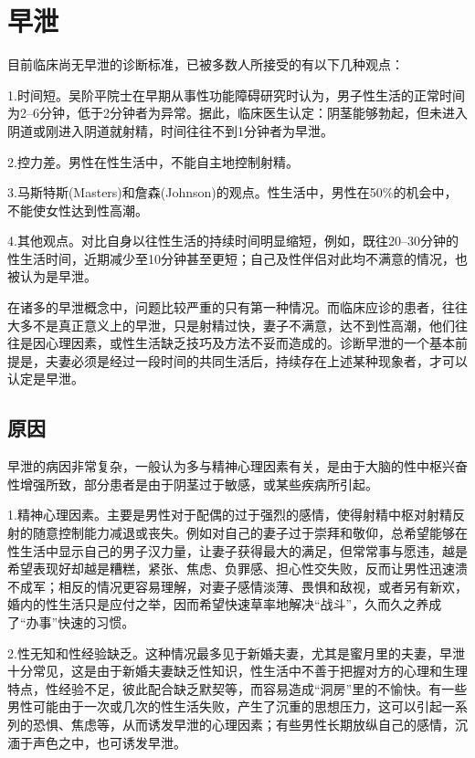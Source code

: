 \documentclass[12pt,UTF8]{ctexbook}
\begin{document}
\chapter{早泄}

目前临床尚无早泄的诊断标准，已被多数人所接受的有以下几种观点：

1.时间短。吴阶平院士在早期从事性功能障碍研究时认为，男子性生活的正常时间为2--6分钟，低于2分钟者为异常。据此，临床医生认定：阴茎能够勃起，但未进入阴道或刚进入阴道就射精，时间往往不到1分钟者为早泄。

2.控力差。男性在性生活中，不能自主地控制射精。

3.马斯特斯(Masters)和詹森(Johnson)的观点。性生活中，男性在50\%的机会中，不能使女性达到性高潮。

4.其他观点。对比自身以往性生活的持续时间明显缩短，例如，既往20--30分钟的性生活时间，近期减少至10分钟甚至更短；自己及性伴侣对此均不满意的情况，也被认为是早泄。

在诸多的早泄概念中，问题比较严重的只有第一种情况。而临床应诊的患者，往往大多不是真正意义上的早泄，只是射精过快，妻子不满意，达不到性高潮，他们往往是因心理因素，或性生活缺乏技巧及方法不妥而造成的。诊断早泄的一个基本前提是，夫妻必须是经过一段时间的共同生活后，持续存在上述某种现象者，才可以认定是早泄。

\section{原因}

早泄的病因非常复杂，一般认为多与精神心理因素有关，是由于大脑的性中枢兴奋性增强所致，部分患者是由于阴茎过于敏感，或某些疾病所引起。

1.精神心理因素。主要是男性对于配偶的过于强烈的感情，使得射精中枢对射精反射的随意控制能力减退或丧失。例如对自己的妻子过于崇拜和敬仰，总希望能够在性生活中显示自己的男子汉力量，让妻子获得最大的满足，但常常事与愿违，越是希望表现好却越是糟糕，紧张、焦虑、负罪感、担心性交失败，反而让男性迅速溃不成军；相反的情况更容易理解，对妻子感情淡薄、畏惧和敌视，或者另有新欢，婚内的性生活只是应付之举，因而希望快速草率地解决“战斗”，久而久之养成了“办事”快速的习惯。

2.性无知和性经验缺乏。这种情况最多见于新婚夫妻，尤其是蜜月里的夫妻，早泄十分常见，这是由于新婚夫妻缺乏性知识，性生活中不善于把握对方的心理和生理特点，性经验不足，彼此配合缺乏默契等，而容易造成“洞房”里的不愉快。有一些男性可能由于一次或几次的性生活失败，产生了沉重的思想压力，这可以引起一系列的恐惧、焦虑等，从而诱发早泄的心理因素；有些男性长期放纵自己的感情，沉湎于声色之中，也可诱发早泄。
\end{document}
